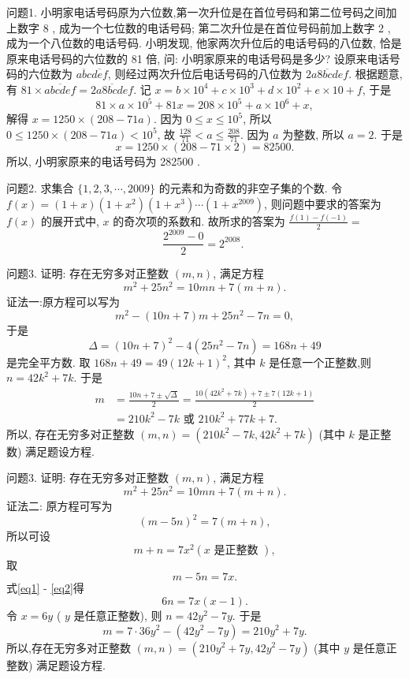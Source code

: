 
问题1. 小明家电话号码原为六位数,第一次升位是在首位号码和第二位号码之间加上数字 8 , 成为一个七位数的电话号码; 第二次升位是在首位号码前加上数字 2 , 成为一个八位数的电话号码.
小明发现, 他家两次升位后的电话号码的八位数, 恰是原来电话号码的六位数的 81 倍, 问: 小明家原来的电话号码是多少?
设原来电话号码的六位数为 $\overline{a b c} \overline{d e f}$, 则经过两次升位后电话号码的八位数为 $\overline{2 a 8 b c d e f}$. 根据题意, 有 $81 \times \overline{a b c d e f}=\overline{2 a 8 b c d e f}$.
记 $x=b \times 10^4+c \times 10^3+d \times 10^2+e \times 10+f$, 于是
$$
81 \times a \times 10^5+81 x=208 \times 10^5+a \times 10^6+x,
$$
解得 $x=1250 \times(208-71 a)$.
因为 $0 \leqslant x \leqslant 10^5$, 所以 $0 \leqslant 1250 \times(208-71 a)<10^5$, 故 $\frac{128}{71}<a \leqslant \frac{208}{71}$.
因为 $a$ 为整数, 所以 $a=2$. 于是
$$
x=1250 \times(208-71 \times 2)=82500 .
$$
所以, 小明家原来的电话号码为 282500 .



问题2. 求集合 $\{1,2,3, \cdots, 2009\}$ 的元素和为奇数的非空子集的个数.
令 $f(x)=(1+x)\left(1+x^2\right)\left(1+x^3\right) \cdots\left(1+x^{2009}\right)$, 则问题中要求的答案为 $f(x)$ 的展开式中, $x$ 的奇次项的系数和.
故所求的答案为 $\frac{f(1)-f(-1)}{2}=$
$$
\frac{2^{2009}-0}{2}=2^{2008} \text {. }
$$



问题3. 证明: 存在无穷多对正整数 $(m, n)$, 满足方程
$$
m^2+25 n^2=10 m n+7(m+n) .
$$
证法一:原方程可以写为
$$
m^2-(10 n+7) m+25 n^2-7 n=0,
$$
于是
$$
\Delta=(10 n+7)^2-4\left(25 n^2-7 n\right)=168 n+49
$$
是完全平方数.
取 $168 n+49=49(12 k+1)^2$, 其中 $k$ 是任意一个正整数,则 $n=42 k^2+7 k$.
于是
$$
\begin{aligned}
m & =\frac{10 n+7 \pm \sqrt{\Delta}}{2}=\frac{10\left(42 k^2+7 k\right)+7 \pm 7(12 k+1)}{2} \\
& =210 k^2-7 k \text { 或 } 210 k^2+77 k+7 .
\end{aligned}
$$
所以, 存在无穷多对正整数 $(m, n)=\left(210 k^2-7 k, 42 k^2+7 k\right)$ (其中 $k$ 是正整数) 满足题设方程.



问题3. 证明: 存在无穷多对正整数 $(m, n)$, 满足方程
$$
m^2+25 n^2=10 m n+7(m+n) .
$$
证法二: 原方程可写为
$$
(m-5 n)^2=7(m+n),
$$
所以可设
$$
m+n=7 x^2 \left( x \text { 是正整数 }\right) , \label{eq1}
$$
取
$$
m-5 n=7 x . \label{eq2}
$$
式\ref{eq1} - \ref{eq2}得
$$
6 n=7 x(x-1) .
$$
令 $x=6 y$ ( $y$ 是任意正整数), 则 $n=42 y^2-7 y$. 于是
$$
m=7 \cdot 36 y^2-\left(42 y^2-7 y\right)=210 y^2+7 y .
$$
所以,存在无穷多对正整数 $(m, n)=\left(210 y^2+7 y, 42 y^2-7 y\right)$ (其中 $y$ 是任意正整数) 满足题设方程.



